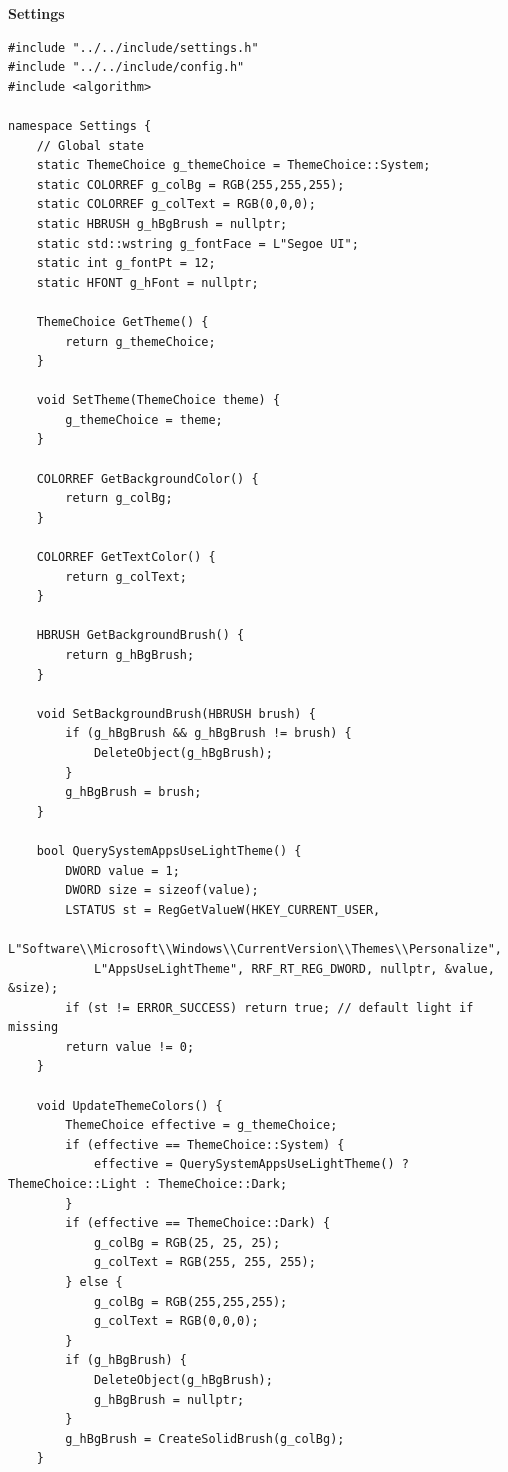 \textbf{Settings}
\begin{lstlisting}[style=CodeListing]
#include "../../include/settings.h"
#include "../../include/config.h"
#include <algorithm>

namespace Settings {
    // Global state
    static ThemeChoice g_themeChoice = ThemeChoice::System;
    static COLORREF g_colBg = RGB(255,255,255);
    static COLORREF g_colText = RGB(0,0,0);
    static HBRUSH g_hBgBrush = nullptr;
    static std::wstring g_fontFace = L"Segoe UI";
    static int g_fontPt = 12;
    static HFONT g_hFont = nullptr;
    
    ThemeChoice GetTheme() {
        return g_themeChoice;
    }
    
    void SetTheme(ThemeChoice theme) {
        g_themeChoice = theme;
    }
    
    COLORREF GetBackgroundColor() {
        return g_colBg;
    }
    
    COLORREF GetTextColor() {
        return g_colText;
    }
    
    HBRUSH GetBackgroundBrush() {
        return g_hBgBrush;
    }
    
    void SetBackgroundBrush(HBRUSH brush) {
        if (g_hBgBrush && g_hBgBrush != brush) {
            DeleteObject(g_hBgBrush);
        }
        g_hBgBrush = brush;
    }
    
    bool QuerySystemAppsUseLightTheme() {
        DWORD value = 1;
        DWORD size = sizeof(value);
        LSTATUS st = RegGetValueW(HKEY_CURRENT_USER,
            L"Software\\Microsoft\\Windows\\CurrentVersion\\Themes\\Personalize",
            L"AppsUseLightTheme", RRF_RT_REG_DWORD, nullptr, &value, &size);
        if (st != ERROR_SUCCESS) return true; // default light if missing
        return value != 0;
    }
    
    void UpdateThemeColors() {
        ThemeChoice effective = g_themeChoice;
        if (effective == ThemeChoice::System) {
            effective = QuerySystemAppsUseLightTheme() ? ThemeChoice::Light : ThemeChoice::Dark;
        }
        if (effective == ThemeChoice::Dark) {
            g_colBg = RGB(25, 25, 25);
            g_colText = RGB(255, 255, 255);
        } else {
            g_colBg = RGB(255,255,255);
            g_colText = RGB(0,0,0);
        }
        if (g_hBgBrush) { 
            DeleteObject(g_hBgBrush); 
            g_hBgBrush = nullptr; 
        }
        g_hBgBrush = CreateSolidBrush(g_colBg);
    }
    

\end{lstlisting}
